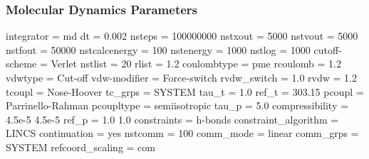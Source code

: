 \documentclass[
  twocolumn]{biophys-new-mod}
\newenvironment{Shaded}{\begin{snugshade}}{\end{snugshade}}
\newcommand{\ExtensionTok}[1]{\textcolor[rgb]{0.00,0.23,0.31}{#1}}
\newcommand{\NormalTok}[1]{\textcolor[rgb]{0.00,0.23,0.31}{#1}}
\begin{document}
\hypertarget{sec-prod-mdp}{%
\subsubsection{Molecular Dynamics Parameters}\label{sec-prod-mdp}}

\begin{Shaded}
\begin{Highlighting}[]
\ExtensionTok{integrator}\NormalTok{              = md}
\ExtensionTok{dt}\NormalTok{                      = 0.002}
\ExtensionTok{nsteps}\NormalTok{                  = 100000000}
\ExtensionTok{nstxout}\NormalTok{                 = 5000}
\ExtensionTok{nstvout}\NormalTok{                 = 5000}
\ExtensionTok{nstfout}\NormalTok{                 = 50000}
\ExtensionTok{nstcalcenergy}\NormalTok{           = 100}
\ExtensionTok{nstenergy}\NormalTok{               = 1000}
\ExtensionTok{nstlog}\NormalTok{                  = 1000}
\ExtensionTok{cutoff{-}scheme}\NormalTok{           = Verlet}
\ExtensionTok{nstlist}\NormalTok{                 = 20}
\ExtensionTok{rlist}\NormalTok{                   = 1.2}
\ExtensionTok{coulombtype}\NormalTok{             = pme}
\ExtensionTok{rcoulomb}\NormalTok{                = 1.2}
\ExtensionTok{vdwtype}\NormalTok{                 = Cut{-}off}
\ExtensionTok{vdw{-}modifier}\NormalTok{            = Force{-}switch}
\ExtensionTok{rvdw\_switch}\NormalTok{             = 1.0}
\ExtensionTok{rvdw}\NormalTok{                    = 1.2}
\ExtensionTok{tcoupl}\NormalTok{                  = Nose{-}Hoover}
\ExtensionTok{tc\_grps}\NormalTok{                 = SYSTEM}
\ExtensionTok{tau\_t}\NormalTok{                   = 1.0}
\ExtensionTok{ref\_t}\NormalTok{                   = 303.15}
\ExtensionTok{pcoupl}\NormalTok{                  = Parrinello{-}Rahman}
\ExtensionTok{pcoupltype}\NormalTok{              = semiisotropic}
\ExtensionTok{tau\_p}\NormalTok{                   = 5.0}
\ExtensionTok{compressibility}\NormalTok{         = 4.5e{-}5  4.5e{-}5}
\ExtensionTok{ref\_p}\NormalTok{                   = 1.0     1.0}
\ExtensionTok{constraints}\NormalTok{             = h{-}bonds}
\ExtensionTok{constraint\_algorithm}\NormalTok{    = LINCS}
\ExtensionTok{continuation}\NormalTok{            = yes}
\ExtensionTok{nstcomm}\NormalTok{                 = 100}
\ExtensionTok{comm\_mode}\NormalTok{               = linear}
\ExtensionTok{comm\_grps}\NormalTok{               = SYSTEM}
\ExtensionTok{refcoord\_scaling}\NormalTok{        = com}
\end{Highlighting}
\end{Shaded}
\end{document}
